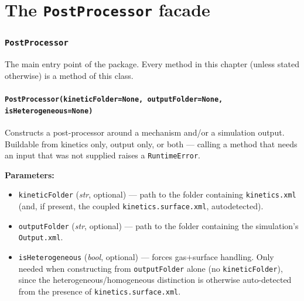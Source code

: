 \documentclass[11pt,a4paper]{report}
\newcommand{\pyclass}[1]{\subsection{\texttt{#1}}}
\newcommand{\pymethod}[1]{\subsubsection{\texttt{#1}}}
\newenvironment{params}{\vspace{1mm}\noindent\textbf{Parameters:}\begin{itemize}[leftmargin=1.1cm,label={--},itemsep=1pt,topsep=2pt]}{\end{itemize}}
\newcommand{\pkg}[1]{\lstinline|#1|}
\begin{document}
\chapter{The \texttt{PostProcessor} facade}

\pyclass{PostProcessor}

The main entry point of the package. Every method in this chapter (unless
stated otherwise) is a method of this class.

\pymethod{PostProcessor(kineticFolder=None, outputFolder=None, isHeterogeneous=None)}

Constructs a post-processor around a mechanism and/or a simulation output.
Buildable from kinetics only, output only, or both --- calling a method that
needs an input that was not supplied raises a \pkg{RuntimeError}.

\begin{params}
\item \pkg{kineticFolder} (\textit{str}, optional) --- path to the folder
  containing \pkg{kinetics.xml} (and, if present, the coupled
  \pkg{kinetics.surface.xml}, autodetected).
\item \pkg{outputFolder} (\textit{str}, optional) --- path to the folder
  containing the simulation's \pkg{Output.xml}.
\item \pkg{isHeterogeneous} (\textit{bool}, optional) --- forces
  gas+surface handling. Only needed when constructing from
  \pkg{outputFolder} alone (no \pkg{kineticFolder}), since the
  heterogeneous/homogeneous distinction is otherwise auto-detected from the
  presence of \pkg{kinetics.surface.xml}.
\end{params}
\end{document}
